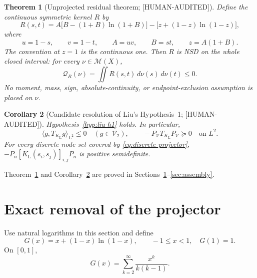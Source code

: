 \documentclass[11pt]{article}
\theoremstyle{plain}
\newtheorem{theorem}{Theorem}[section]
\newtheorem{corollary}[theorem]{Corollary}
\theoremstyle{definition}
\theoremstyle{remark}
\newcommand{\M}{\mathcal M}
\newcommand{\V}{\mathcal V}
\newcommand{\QF}{\mathcal Q}
\newcommand{\status}[1]{\textnormal{\textsf{\footnotesize[#1]}}}
\newcommand{\HumanAudited}{\status{HUMAN-AUDITED}}
\begin{document}
\begin{theorem}[Unprojected residual theorem; \HumanAudited]
\label{thm:residual}
Define the continuous symmetric kernel \(R\) by
\begin{equation}
  R(s,t)
  =A\bigl[B-(1+B)\ln(1+B)\bigr]
   -\bigl[z+(1-z)\ln(1-z)\bigr],
  \label{eq:residual}
\end{equation}
where
\begin{equation}
  u=1-s,\qquad v=1-t,\qquad A=uv,\qquad B=st,
  \qquad z=A(1+B).
  \label{eq:ABz}
\end{equation}
The convention at \(z=1\) is the continuous one.  Then \(R\) is NSD on the
whole closed interval: for every \(\nu\in\M(X)\),
\begin{equation}
  \QF_R(\nu)=\iint R(s,t)\,d\nu(s)\,d\nu(t)\le0.
  \label{eq:residual-nsd}
\end{equation}
No moment, mass, sign, absolute-continuity, or endpoint-exclusion assumption is
placed on \(\nu\).
\end{theorem}

\begin{corollary}[Candidate resolution of Liu's Hypothesis~1;
\HumanAudited]
\label{cor:liu-h1}
Hypothesis~\ref{hyp:liu-h1} holds.  In particular,
\begin{equation}
  \langle g,T_{K_{\mathrm L}}g\rangle_{L^2}\le0
  \quad(g\in\V_2),
  \qquad
  -P_{\V}T_{K_{\mathrm L}}P_{\V}\succeq0
  \quad\text{on }L^2.
  \label{eq:operator-consequence}
\end{equation}
For every discrete node set covered by \eqref{eq:discrete-projector},
\(-P_n[K_{\mathrm L}(s_i,s_j)]_{i,j}P_n\) is positive semidefinite.
\end{corollary}

Theorem~\ref{thm:residual} and Corollary~\ref{cor:liu-h1} are proved in
Sections~\ref{sec:reduction}--\ref{sec:assembly}.

\section{Exact removal of the projector}
\label{sec:reduction}

Use natural logarithms in this section and define
\begin{equation}
  G(x)=x+(1-x)\ln(1-x),\qquad -1\le x<1,
  \quad G(1)=1.
  \label{eq:G-definition}
\end{equation}
On \([0,1]\),
\begin{equation}
  G(x)=\sum_{k=2}^{\infty}\frac{x^k}{k(k-1)}.
  \label{eq:G-series}
\end{equation}
\end{document}
